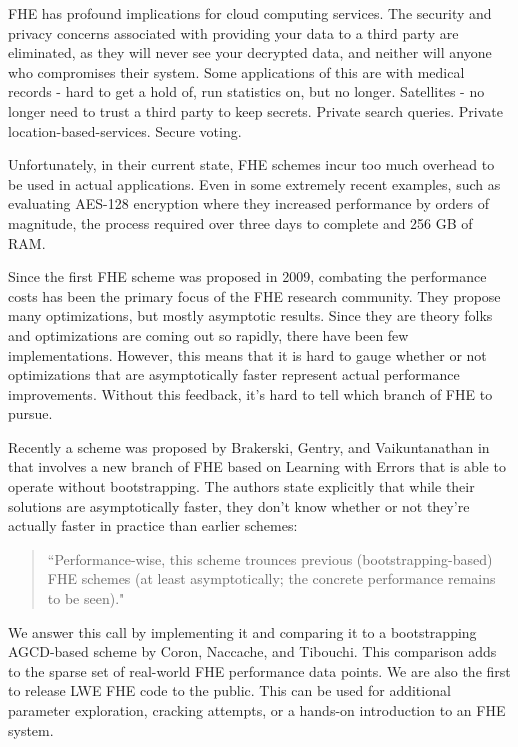 \documentclass[letterpaper,twocolumn,10pt]{article}
\begin{document}
FHE has profound implications for cloud computing services. The security and privacy concerns associated with providing your data to a third party are eliminated, as they will never see your decrypted data, and neither will anyone who compromises their system. Some applications of this are with medical records - hard to get a hold of, run statistics on, but no longer. Satellites - no longer need to trust a third party to keep secrets. Private search queries. Private location-based-services. Secure voting.

Unfortunately, in their current state, FHE schemes incur too much overhead to be used in actual applications. Even in some extremely recent examples, such as evaluating AES-128 encryption where they increased performance by orders of magnitude, the process required over three days to complete and 256 GB of RAM\cite{AES}. 

Since the first FHE scheme was proposed in 2009, combating the performance costs has been the primary focus of the FHE research community. They propose many optimizations, but mostly asymptotic results. Since they are theory folks and optimizations are coming out so rapidly, there have been few implementations. However, this means that it is hard to gauge whether or not optimizations that are asymptotically faster represent actual performance improvements. Without this feedback, it's hard to tell which branch of FHE to pursue.

Recently a scheme was proposed by Brakerski, Gentry, and Vaikuntanathan in \cite{SansBootstrapping} that involves a new branch of FHE based on Learning with Errors that is able to operate without bootstrapping. The authors state explicitly that while their solutions are asymptotically faster, they don't know whether or not they're actually faster in practice than earlier schemes:

\begin{quotation}
``Performance-wise, this scheme trounces previous (bootstrapping-based) FHE schemes (at least asymptotically; the concrete performance remains to be seen)."
\end{quotation}

We answer this call by implementing it and comparing it to a bootstrapping AGCD-based scheme by Coron, Naccache, and Tibouchi. This comparison adds to the sparse set of real-world FHE performance data points. We are also the first to release LWE FHE code to the public. This can be used for additional parameter exploration, cracking attempts, or a hands-on introduction to an FHE system.
\end{document}
